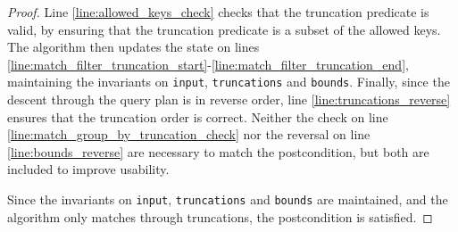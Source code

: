 \documentclass{article}
\begin{document}
\begin{proof}
    Line \ref{line:allowed_keys_check} checks that the truncation predicate is valid,
    by ensuring that the truncation predicate is a subset of the allowed keys.
    The algorithm then updates the state on lines \ref{line:match_filter_truncation_start}-\ref{line:match_filter_truncation_end},
    maintaining the invariants on \texttt{input}, \texttt{truncations} and \texttt{bounds}.
    Finally, since the descent through the query plan is in reverse order,
    line \ref{line:truncations_reverse} ensures that the truncation order is correct.
    Neither the check on line \ref{line:match_group_by_truncation_check} 
    nor the reversal on line \ref{line:bounds_reverse} are necessary to match the postcondition,
    but both are included to improve usability.

    Since the invariants on \texttt{input}, \texttt{truncations} and \texttt{bounds} are maintained,
    and the algorithm only matches through truncations,
    the postcondition is satisfied.
\end{proof}
\end{document}
